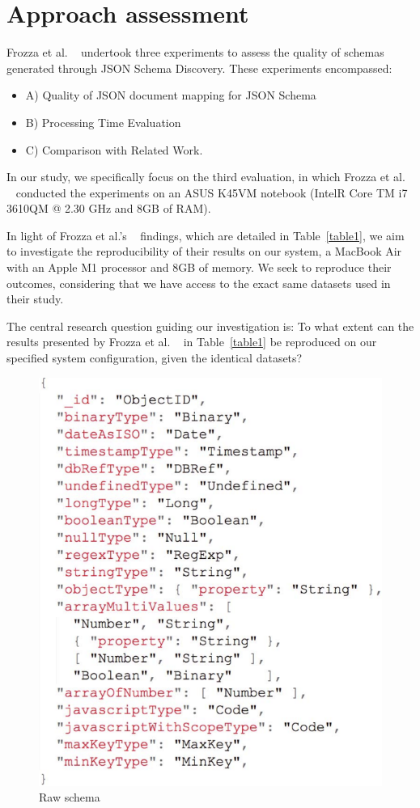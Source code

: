 \documentclass[sigconf, nonacm]{acmart}
\begin{document}
\section{Approach assessment}

Frozza et al. ~\cite{frozza2018approach} undertook three experiments to assess the quality of schemas generated through JSON Schema Discovery. These experiments encompassed:

\begin{itemize}
    \item A) Quality of JSON document mapping for JSON Schema
    \item B) Processing Time Evaluation
    \item C) Comparison with Related Work.
\end{itemize}
In our study, we specifically focus on the third evaluation, in which Frozza et al. ~\cite{frozza2018approach} conducted the experiments on an ASUS K45VM notebook (IntelR Core TM i7 3610QM @ 2.30 GHz and 8GB of RAM).

In light of Frozza et al.'s ~\cite{frozza2018approach} findings, which are detailed in Table~\ref{table1}, we aim to investigate the reproducibility of their results on our system, a MacBook Air with an Apple M1 processor and 8GB of memory. We seek to reproduce their outcomes, considering that we have access to the exact same datasets used in their study.

The central research question guiding our investigation is: To what extent can the results presented by Frozza et al. ~\cite{frozza2018approach} in Table~\ref{table1} be reproduced on our specified system configuration, given the identical datasets?


\begin{figure}
  \centering
  \includegraphics[width=0.6\linewidth]{figures/rawschema.png}
  \vspace{-10pt} %
  \caption{Raw schema\cite{frozza2018approach}}
  \label{fig:rawschema}
\end{figure}
\end{document}
